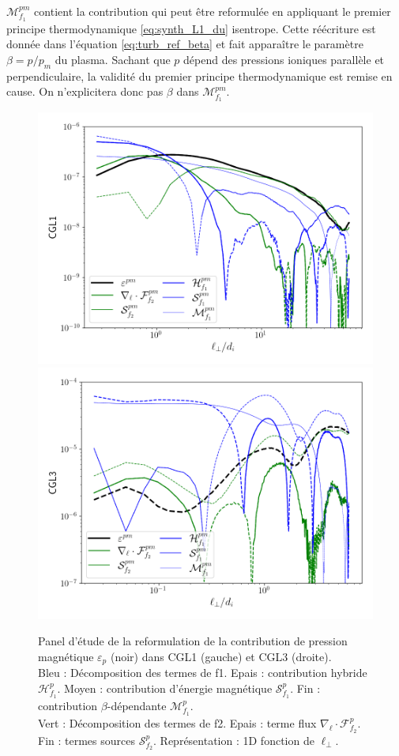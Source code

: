  $\mathcal{M}^{pm}_{f_1}$ contient la contribution qui peut être reformulée en appliquant le premier principe thermodynamique \eqref{eq:synth_L1_du} isentrope. Cette réécriture est donnée dans l'équation \eqref{eq:turb_ref_beta} et fait apparaître le paramètre $\beta = p/p_m$ du plasma. Sachant que $p$ dépend des pressions ioniques parallèle et perpendiculaire, la validité du premier principe thermodynamique est remise en cause. On n'explicitera donc pas $\beta$ dans $\mathcal{M}^{pm}_{f_1}$.
 \begin{figure}[!ht]
  \centering
  \includegraphics[width=0.49\linewidth,trim=1cm 1cm 1cm 1cm, clip=true]{./Mainmatter/Part_3/images_ch2/CGL1_f2pm_1D_lperp}
 \hfill
 \includegraphics[width=0.49\linewidth,trim=1cm 1cm 1cm 1cm, clip=true]{./Mainmatter/Part_3/images_ch2/CGL3_f2pm_1D_lperp}
 \cprotect\caption{Panel d'étude de la reformulation de la contribution de pression magnétique \ensuremath{\varepsilon_{p}} (noir) dans CGL1 (gauche) et CGL3 (droite). \\ Bleu : Décomposition des termes de f1. Epais : contribution hybride \ensuremath{\mathcal{H}^{p}_{f_1}}. Moyen : contribution d'énergie magnétique \ensuremath{\mathcal{S}^{p}_{f_1}}. Fin :  contribution \ensuremath{\beta}-dépendante \ensuremath{\mathcal{M}^{p}_{f_1}}.\\Vert : Décomposition des termes de f2. Epais : terme flux \ensuremath{\nabla_{\boldsymbol{\ell}} \cdot \mathcal{F}^{p}_{f_2}}. Fin : termes sources \ensuremath{\mathcal{S}^{p}_{f_2}}. Représentation : 1D fonction de \ensuremath{\ell_{\perp}}.}
 \label{fig:elf2pm}
 \end{figure}
 
